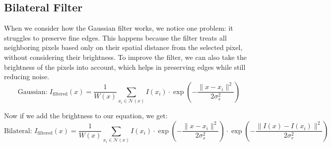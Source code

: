 \documentclass[hidelinks,12pt]{article}
\begin{document}
	\subsection{Bilateral Filter}
	When we consider how the Gaussian filter works, we notice one problem: it struggles to preserve fine edges. This happens because the filter treats all neighboring pixels based only on their spatial distance from the selected pixel, without considering their brightness. To improve the filter, we can also take the brightness of the pixels into account, which helps in preserving edges while still reducing noise.
	$$
	\text{Gaussian: } I_{\text{filtered}}(x) = \frac{1}{W(x)} \sum_{x_i \in \mathcal{N}(x)} I(x_i) \cdot \exp\left(-\frac{\|x - x_i\|^2}{2\sigma_s^2}\right)
	$$
	
	Now if we add the brightness to our equation, we get:
	$$
	\text{Bilateral: }I_{\text{filtered}}(x) = \frac{1}{W(x)} \sum_{x_i \in \mathcal{N}(x)} I(x_i) \cdot \exp \left( - \frac{\| x - x_i \|^2}{2 \sigma_s^2} \right) \cdot \exp \left(- \frac{\| I(x) - I(x_i) \|^2}{2 \sigma_r^2}\right)
	$$
	
\end{document}

